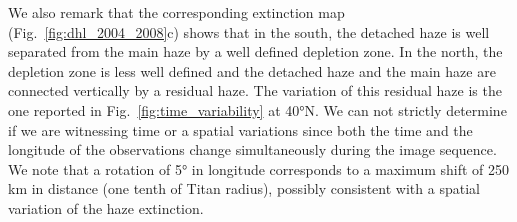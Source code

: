 We also remark that the corresponding extinction map (Fig.~\ref{fig:dhl_2004_2008}c) shows that in the south,
the detached haze is well separated from the main haze by a well defined depletion zone. In the north, the depletion
zone is less well defined and the detached haze and the main haze are connected vertically by a residual haze.
The variation of this residual haze is the one reported in Fig.~\ref{fig:time_variability} at \ang{40}N.
We can not strictly determine if we are witnessing time or a spatial variations since both the time and the longitude
of the observations change simultaneously during the image sequence. We note that a rotation of \ang{5} in longitude
corresponds to a maximum shift of 250 km in distance (one tenth of Titan radius), possibly consistent with a spatial
variation of the haze extinction.
